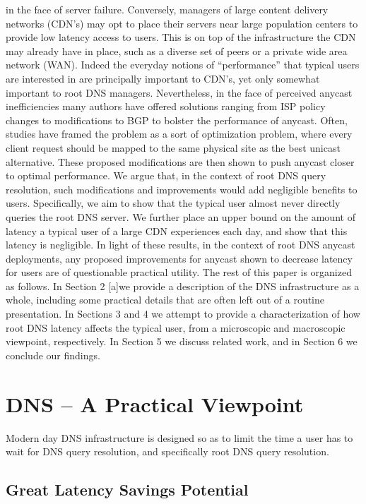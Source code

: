 \documentclass[sigconf,nonacm,10pt]{acmart}
\begin{document}
in the face of server failure. Conversely, managers of large content
delivery networks (CDN's) may opt to place their servers near large
population centers to provide low latency access to users. This is on
top of the infrastructure the CDN may already have in place, such as a
diverse set of peers or a private wide area network (WAN). Indeed the
everyday notions of ``performance'' that typical users are interested in
are principally important to CDN's, yet only somewhat important to root
DNS managers. Nevertheless, in the face of perceived anycast
inefficiencies many authors have offered solutions ranging from ISP
policy changes to modifications to BGP to bolster the performance of
anycast. Often, studies have framed the problem as a sort of
optimization problem, where every client request should be mapped to the
same physical site as the best unicast alternative. These proposed
modifications are then shown to push anycast closer to optimal
performance. We argue that, in the context of root DNS query resolution,
such modifications and improvements would add negligible benefits to
users. Specifically, we aim to show that the typical user almost never
directly queries the root DNS server. We further place an upper bound on
the amount of latency a typical user of a large CDN experiences each
day, and show that this latency is negligible. In light of these
results, in the context of root DNS anycast deployments, any proposed
improvements for anycast shown to decrease latency for users are of
questionable practical utility. The rest of this paper is organized as
follows. In Section 2 {[}a{]}we provide a description of the DNS
infrastructure as a whole, including some practical details that are
often left out of a routine presentation. In Sections 3 and 4 we attempt
to provide a characterization of how root DNS latency affects the
typical user, from a microscopic and macroscopic viewpoint,
respectively. In Section 5 we discuss related work, and in Section 6 we
conclude our findings.

\section{DNS -- A Practical
Viewpoint}\label{dns-a-practical-viewpoint-1}

Modern day DNS infrastructure is designed so as to limit the time a user
has to wait for DNS query resolution, and specifically root DNS query
resolution.

\subsection{Great Latency Savings
Potential}\label{great-latency-savings-potential-1}
\end{document}
